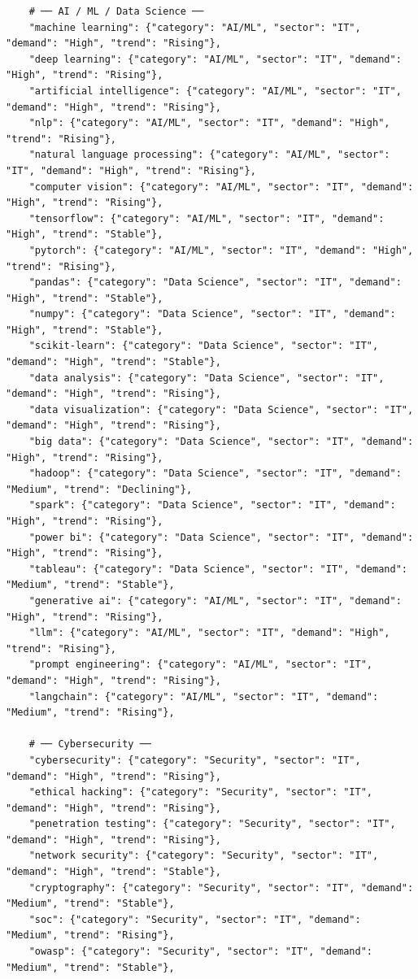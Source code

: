 \documentclass[12pt,a4paper]{report}
\begin{document}
\begin{verbatim}
    # ── AI / ML / Data Science ──
    "machine learning": {"category": "AI/ML", "sector": "IT", "demand": "High", "trend": "Rising"},
    "deep learning": {"category": "AI/ML", "sector": "IT", "demand": "High", "trend": "Rising"},
    "artificial intelligence": {"category": "AI/ML", "sector": "IT", "demand": "High", "trend": "Rising"},
    "nlp": {"category": "AI/ML", "sector": "IT", "demand": "High", "trend": "Rising"},
    "natural language processing": {"category": "AI/ML", "sector": "IT", "demand": "High", "trend": "Rising"},
    "computer vision": {"category": "AI/ML", "sector": "IT", "demand": "High", "trend": "Rising"},
    "tensorflow": {"category": "AI/ML", "sector": "IT", "demand": "High", "trend": "Stable"},
    "pytorch": {"category": "AI/ML", "sector": "IT", "demand": "High", "trend": "Rising"},
    "pandas": {"category": "Data Science", "sector": "IT", "demand": "High", "trend": "Stable"},
    "numpy": {"category": "Data Science", "sector": "IT", "demand": "High", "trend": "Stable"},
    "scikit-learn": {"category": "Data Science", "sector": "IT", "demand": "High", "trend": "Stable"},
    "data analysis": {"category": "Data Science", "sector": "IT", "demand": "High", "trend": "Rising"},
    "data visualization": {"category": "Data Science", "sector": "IT", "demand": "High", "trend": "Rising"},
    "big data": {"category": "Data Science", "sector": "IT", "demand": "High", "trend": "Rising"},
    "hadoop": {"category": "Data Science", "sector": "IT", "demand": "Medium", "trend": "Declining"},
    "spark": {"category": "Data Science", "sector": "IT", "demand": "High", "trend": "Rising"},
    "power bi": {"category": "Data Science", "sector": "IT", "demand": "High", "trend": "Rising"},
    "tableau": {"category": "Data Science", "sector": "IT", "demand": "Medium", "trend": "Stable"},
    "generative ai": {"category": "AI/ML", "sector": "IT", "demand": "High", "trend": "Rising"},
    "llm": {"category": "AI/ML", "sector": "IT", "demand": "High", "trend": "Rising"},
    "prompt engineering": {"category": "AI/ML", "sector": "IT", "demand": "High", "trend": "Rising"},
    "langchain": {"category": "AI/ML", "sector": "IT", "demand": "Medium", "trend": "Rising"},

    # ── Cybersecurity ──
    "cybersecurity": {"category": "Security", "sector": "IT", "demand": "High", "trend": "Rising"},
    "ethical hacking": {"category": "Security", "sector": "IT", "demand": "High", "trend": "Rising"},
    "penetration testing": {"category": "Security", "sector": "IT", "demand": "High", "trend": "Rising"},
    "network security": {"category": "Security", "sector": "IT", "demand": "High", "trend": "Stable"},
    "cryptography": {"category": "Security", "sector": "IT", "demand": "Medium", "trend": "Stable"},
    "soc": {"category": "Security", "sector": "IT", "demand": "Medium", "trend": "Rising"},
    "owasp": {"category": "Security", "sector": "IT", "demand": "Medium", "trend": "Stable"},


\end{verbatim}
\end{document}
